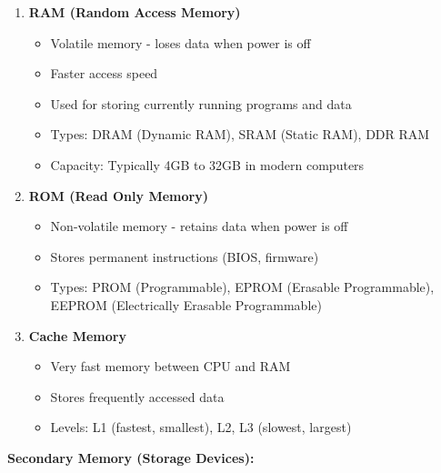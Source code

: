 \documentclass[12pt,a4paper]{article}
\begin{document}
\begin{enumerate}
    \item \textbf{RAM (Random Access Memory)}
    \begin{itemize}
        \item Volatile memory - loses data when power is off
        \item Faster access speed
        \item Used for storing currently running programs and data
        \item Types: DRAM (Dynamic RAM), SRAM (Static RAM), DDR RAM
        \item Capacity: Typically 4GB to 32GB in modern computers
    \end{itemize}
    
    \item \textbf{ROM (Read Only Memory)}
    \begin{itemize}
        \item Non-volatile memory - retains data when power is off
        \item Stores permanent instructions (BIOS, firmware)
        \item Types: PROM (Programmable), EPROM (Erasable Programmable), EEPROM (Electrically Erasable Programmable)
    \end{itemize}
    
    \item \textbf{Cache Memory}
    \begin{itemize}
        \item Very fast memory between CPU and RAM
        \item Stores frequently accessed data
        \item Levels: L1 (fastest, smallest), L2, L3 (slowest, largest)
    \end{itemize}
\end{enumerate}

\textbf{Secondary Memory (Storage Devices):}
\end{document}
